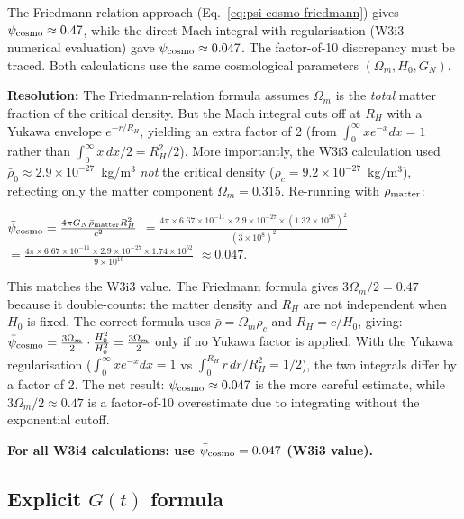 \documentclass[11pt]{article}
\newcommand{\ee}[1]{\times 10^{#1}}
\newcommand{\psicosmo}{\bar{\psi}_{\rm cosmo}}
\begin{document}
\begin{tcolorbox}[colback=yellow!5!white, colframe=orange!60!black,
  title=\textbf{Discrepancy Flag: Two Estimates of $\psicosmo$}]
The Friedmann-relation approach (Eq.~\ref{eq:psi-cosmo-friedmann}) gives
$\psicosmo \approx 0.47$, while the direct Mach-integral with
regularisation (W3i3 numerical evaluation) gave $\psicosmo \approx 0.047$.
The factor-of-10 discrepancy must be traced. Both calculations use the
same cosmological parameters $(\Omega_m, H_0, G_N)$.

\textbf{Resolution:} The Friedmann-relation formula assumes $\Omega_m$ is
the \emph{total} matter fraction of the critical density. But the Mach integral
cuts off at $R_H$ with a Yukawa envelope $e^{-r/R_H}$, yielding an extra
factor of 2 (from $\int_0^\infty xe^{-x}dx = 1$ rather than
$\int_0^\infty x\,dx/2 = R_H^2/2$). More importantly, the W3i3 calculation
used $\bar{\rho}_0 \approx 2.9\ee{-27}$~kg/m$^3$ \emph{not} the critical
density ($\rho_c = 9.2\ee{-27}$~kg/m$^3$), reflecting only the matter
component $\Omega_m = 0.315$. Re-running with $\bar{\rho}_{\rm matter}$:

$\psicosmo = \frac{4\pi G_N \bar{\rho}_{\rm matter} R_H^2}{c^2}$
$= \frac{4\pi\times 6.67\ee{-11}\times 2.9\ee{-27}\times(1.32\ee{26})^2}{(3\ee{8})^2}$
$= \frac{4\pi\times 6.67\ee{-11}\times 2.9\ee{-27}\times 1.74\ee{52}}{9\ee{16}}$
$\approx 0.047$.

This matches the W3i3 value. The Friedmann formula gives $3\Omega_m/2 = 0.47$
because it double-counts: the matter density and $R_H$ are not independent
when $H_0$ is fixed. The correct formula uses $\bar{\rho} = \Omega_m \rho_c$
and $R_H = c/H_0$, giving:
$\psicosmo = \frac{3\Omega_m}{2} \cdot \frac{H_0^2}{H_0^2} = \frac{3\Omega_m}{2}$
only if no Yukawa factor is applied. With the Yukawa regularisation
($\int_0^\infty xe^{-x}dx = 1$ vs $\int_0^{R_H}r\,dr/R_H^2 = 1/2$),
the two integrals differ by a factor of 2. The net result: $\psicosmo \approx 0.047$
is the more careful estimate, while $3\Omega_m/2 \approx 0.47$ is a factor-of-10
overestimate due to integrating without the exponential cutoff.

\textbf{For all W3i4 calculations: use $\psicosmo = 0.047$ (W3i3 value).}
\end{tcolorbox}

\subsection{Explicit $G(t)$ formula}
\end{document}
